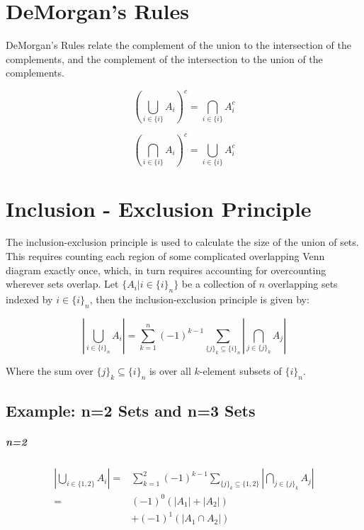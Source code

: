 \section{DeMorgan's Rules}
\label{sec:demorgan}
DeMorgan's Rules relate the complement of the union to the intersection of the complements, and the complement of the intersection to the union of the complements.

\begin{equation}
\left(\bigcup_{i\in\{i\}}A_i\right)^c = \bigcap_{i\in\{i\}}A^c_i
\end{equation}

\begin{equation}
\left(\bigcap_{i\in\{i\}}A_i\right)^c = \bigcup_{i\in\{i\}}A^c_i
\end{equation}


\section{Inclusion - Exclusion Principle}
\label{sec:inclusionexclusion}

The inclusion-exclusion principle is used to calculate the size of the union of sets. This requires counting each region of some complicated overlapping Venn diagram exactly once, which, in turn requires accounting for overcounting wherever sets overlap. Let $\{A_i | i\in \{i\}_n \}$ be a collection of $n$ overlapping sets indexed by $i\in \{i\}_n$, then the inclusion-exclusion principle is given by:

\begin{equation}
\left|\bigcup_{i\in\{i\}_n} A_i\right| = \sum^n_{k=1} (-1)^{k-1} \sum_{\{j\}_k \subseteq \{i\}_n} \left|\bigcap_{j\in\{j\}_k} A_j\right|
\end{equation}


Where the sum over $\{j\}_k \subseteq \{i\}_n$ is over all $k$-element subsets of $\{i\}_n$.

\subsection{Example: n=2 Sets and n=3 Sets}

\subparagraph{n=2}
\begin{equation}
\begin{array}{rl}
\left|\bigcup_{i\in\{1,2\}}A_i\right| =&  \sum^2_{k=1} (-1)^{k-1} \sum_{\{j\}_k \subseteq \{1,2\}} \left|\bigcap_{j\in\{j\}_k} A_j\right|\\
=&(-1)^{0}\left(|A_1| + |A_2|\right) \\
&+ (-1)^{1}\left(|A_1 \cap A_2| \right)
\end{array}
\end{equation}


